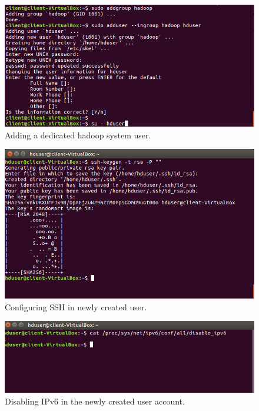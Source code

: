 \documentclass[a4paper,10pt]{article}
\begin{document}
\begin{figure}[h]
	\includegraphics[scale=0.34,center]{exptTwoScreenShot/fig3.png}
	\caption{Adding a dedicated hadoop system user.}
	\label{fig:3}
\end{figure}
\newpage
\begin{figure}[h]
	\includegraphics[scale=0.30,center]{exptTwoScreenShot/fig4.png}
	\caption{Configuring SSH in newly created user.}
	\label{fig:4}
\end{figure}

\begin{figure}[h]
	\includegraphics[scale=0.34,center]{exptTwoScreenShot/fig5.png}
	\caption{Disabling IPv6 in the newly created user account.}
	\label{fig:5.1}
\end{figure}
\end{document}
